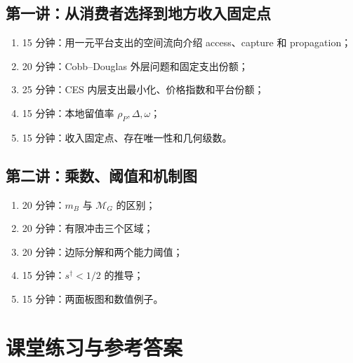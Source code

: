 \documentclass[UTF8,11pt,scheme=chinese,fontset=fandol]{ctexart}
\newcommand{\MG}{\mathcal M_G}
\theoremstyle{definition}
\begin{document}
\subsection*{第一讲：从消费者选择到地方收入固定点}
\begin{enumerate}
  \item 15 分钟：用一元平台支出的空间流向介绍 access、capture 和 propagation；
  \item 20 分钟：Cobb--Douglas 外层问题和固定支出份额；
  \item 25 分钟：CES 内层支出最小化、价格指数和平台份额；
  \item 15 分钟：本地留值率 \(\rho_P,\Delta,\omega\)；
  \item 15 分钟：收入固定点、存在唯一性和几何级数。
\end{enumerate}

\subsection*{第二讲：乘数、阈值和机制图}
\begin{enumerate}
  \item 20 分钟：\(m_B\) 与 \(\MG\) 的区别；
  \item 20 分钟：有限冲击三个区域；
  \item 20 分钟：边际分解和两个能力阈值；
  \item 15 分钟：\(s^\dagger<1/2\) 的推导；
  \item 15 分钟：两面板图和数值例子。
\end{enumerate}

\section{课堂练习与参考答案}
\end{document}
